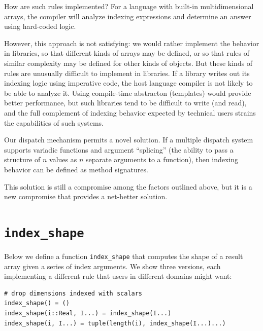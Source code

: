 \documentclass[preprint]{sigplanconf}
\begin{document}
How are such rules implemented? For a
language with built-in multidimensional arrays, the compiler will
analyze indexing expressions and determine an answer using hard-coded
logic.

However, this approach is not satisfying: we would rather
implement the behavior in libraries, so that different kinds of arrays
may be defined, or so that rules of similar complexity may be
defined for other kinds of objects. But these kinds of rules are
unusually difficult to implement in libraries. If a library writes out
its indexing logic using imperative code, the host language compiler
is not likely to be able to analyze it. Using compile-time abstracton
(templates) would provide better performance, but such libraries tend
to be difficult to write (and read), and the full complement of
indexing behavior expected by technical users strains the capabilities
of such systems.


Our dispatch mechanism permits a novel solution. If a multiple dispatch
system supports variadic functions and argument ``splicing'' (the ability
to pass a structure of $n$ values as $n$ separate arguments to a function),
then indexing behavior can be defined as method signatures.

This solution is still a compromise among the factors outlined above,
but it is a new compromise that provides a net-better solution.

\section{\texttt{index\_shape}}

Below we define a function \texttt{index\_shape} that computes the
shape of a result array given a series of index arguments. We show
three versions, each implementing a different rule that users in
different domains might want:


\begin{verbatim}
# drop dimensions indexed with scalars
index_shape() = ()
index_shape(i::Real, I...) = index_shape(I...)
index_shape(i, I...) = tuple(length(i), index_shape(I...)...)
\end{verbatim}
\end{document}
